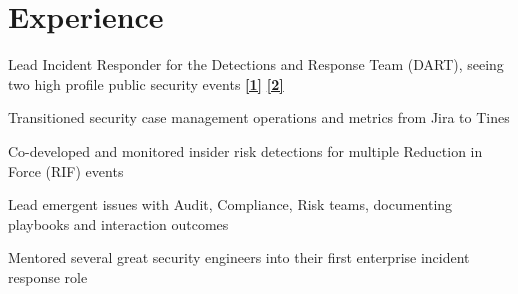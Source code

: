 \documentclass[letterpaper]{deedy-resume} %
\begin{document}
\begin{minipage}[t]{0.66\textwidth} %


\section{Experience}


\vspace{\topsep} %
\begin{tightitemize}
\item Lead Incident Responder for the Detections and Response Team (DART), seeing two high profile public security events \textbf{\href{https://dropbox.tech/security/changing-how-we-identify-malicious-urls-in-shared-documents}{[1]}} \textbf{\href{https://sign.dropbox.com/blog/a-recent-security-incident-involving-dropbox-sign}{[2]}}
\item Transitioned security case management operations and metrics from Jira to Tines
\item Co-developed and monitored insider risk detections for multiple Reduction in Force (RIF) events
\item Lead emergent issues with Audit, Compliance, Risk teams, documenting playbooks and interaction outcomes
\item Mentored several great security engineers into their first enterprise incident response role
\end{tightitemize}

\sectionspace %




\end{minipage}
\end{document}
